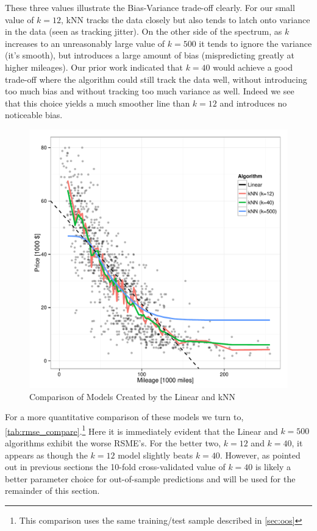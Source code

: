 \documentclass[11pt, fleqn]{article}
\begin{document}
These three values illustrate the Bias-Variance trade-off clearly.  For our small value of $k=12$, kNN tracks the data closely but also tends to latch onto variance in the data (seen as tracking jitter).  On the other side of the spectrum, as $k$ increases to an unreasonably large value of $k=500$ it tends to ignore the variance (it's smooth), but introduces a large amount of bias (mispredicting greatly at higher mileages).  Our prior work indicated that $k=40$ would achieve a good trade-off where the algorithm could still track the data well, without introducing too much bias and without tracking too much variance as well.  Indeed we see that this choice yields a much smoother line than $k=12$ and introduces no noticeable bias.

\begin{figure}[!htb]
  \centering
  \includegraphics[scale=.5]{pred_models.pdf}
  \caption{Comparison of Models Created by the Linear and kNN}
  \label{fig:models}
\end{figure}

For a more quantitative comparison of these models we turn to, \cref{tab:rmse_compare}.\footnote{This comparison uses the same training/test sample described in \cref{sec:oos}}  Here it is immediately evident that the Linear and $k=500$ algorithms exhibit the worse RSME's.  For the better two, $k=12$ and $k=40$, it appears as though the $k=12$ model slightly beats $k=40$.  However, as pointed out in previous sections the 10-fold cross-validated value of $k=40$ is likely a better parameter choice for out-of-sample predictions and will be used for the remainder of this section.
\end{document}
